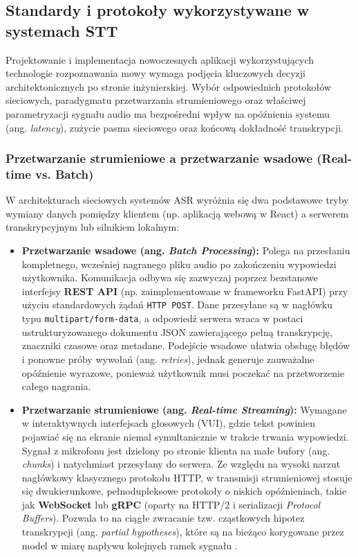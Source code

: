 \subsection{Standardy i protokoły wykorzystywane w systemach STT}
\label{subsec:standards_and_protocols}

Projektowanie i implementacja nowoczesnych aplikacji wykorzystujących technologie rozpoznawania mowy wymaga podjęcia kluczowych decyzji architektonicznych po stronie inżynierskiej. Wybór odpowiednich protokołów sieciowych, paradygmatu przetwarzania strumieniowego oraz właściwej parametryzacji sygnału audio ma bezpośredni wpływ na opóźnienia systemu (ang. \textit{latency}), zużycie pasma sieciowego oraz końcową dokładność transkrypcji.

\subsubsection{Przetwarzanie strumieniowe a przetwarzanie wsadowe (Real-time vs. Batch)}
W architekturach sieciowych systemów ASR wyróżnia się dwa podstawowe tryby wymiany danych pomiędzy klientem (np. aplikacją webową w React) a serwerem transkrypcyjnym lub silnikiem lokalnym:
\begin{itemize}
\item \textbf{Przetwarzanie wsadowe (ang. \textit{Batch Processing}):} Polega na przesłaniu kompletnego, wcześniej nagranego pliku audio po zakończeniu wypowiedzi użytkownika. Komunikacja odbywa się zazwyczaj poprzez bezstanowe interfejsy \textbf{REST API} (np. zaimplementowane w frameworku FastAPI) przy użyciu standardowych żądań \texttt{HTTP POST}. Dane przesyłane są w nagłówku typu \texttt{multipart/form-data}, a odpowiedź serwera wraca w postaci ustrukturyzowanego dokumentu JSON zawierającego pełną transkrypcję, znaczniki czasowe oraz metadane. Podejście wsadowe ułatwia obsługę błędów i ponowne próby wywołań (ang. \textit{retries}), jednak generuje zauważalne opóźnienie wyrazowe, ponieważ użytkownik musi poczekać na przetworzenie całego nagrania.

\item \textbf{Przetwarzanie strumieniowe (ang. \textit{Real-time Streaming}):} Wymagane w interaktywnych interfejsach głosowych (VUI), gdzie tekst powinien pojawiać się na ekranie niemal symultanicznie w trakcie trwania wypowiedzi. Sygnał z mikrofonu jest dzielony po stronie klienta na małe bufory (ang. \textit{chunks}) i natychmiast przesyłany do serwera. Ze względu na wysoki narzut nagłówkowy klasycznego protokołu HTTP, w transmisji strumieniowej stosuje się dwukierunkowe, pełnodupleksowe protokoły o niskich opóźnieniach, takie jak \textbf{WebSocket} lub \textbf{gRPC} (oparty na HTTP/2 i serializacji \textit{Protocol Buffers}). Pozwala to na ciągłe zwracanie tzw. cząstkowych hipotez transkrypcji (ang. \textit{partial hypotheses}), które są na bieżąco korygowane przez model w miarę napływu kolejnych ramek sygnału \cite[s.~18]{pudo2024optimizing}.
\end{itemize}
